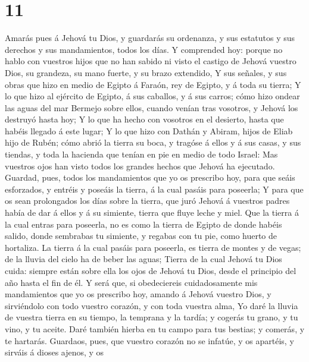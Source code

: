 \hypertarget{section-10}{%
\section{11}\label{section-10}}

 Amarás pues á Jehová tu Dios, y guardarás su ordenanza, y
sus estatutos y sus derechos y sus mandamientos, todos los días.
 Y comprended hoy: porque no hablo con vuestros hijos que no
han sabido ni visto el castigo de Jehová vuestro Dios, su grandeza, su
mano fuerte, y su brazo extendido,  Y sus señales, y sus
obras que hizo en medio de Egipto á Faraón, rey de Egipto, y á toda su
tierra;  Y lo que hizo al ejército de Egipto, á sus
caballos, y á sus carros; cómo hizo ondear las aguas del mar Bermejo
sobre ellos, cuando venían tras vosotros, y Jehová los destruyó hasta
hoy;  Y lo que ha hecho con vosotros en el desierto, hasta
que habéis llegado á este lugar;  Y lo que hizo con Dathán y
Abiram, hijos de Eliab hijo de Rubén; cómo abrió la tierra su boca, y
tragóse á ellos y á sus casas, y sus tiendas, y toda la hacienda que
tenían en pie en medio de todo Israel:  Mas vuestros ojos
han visto todos los grandes hechos que Jehová ha ejecutado. 
Guardad, pues, todos los mandamientos que yo os prescribo hoy, para que
seáis esforzados, y entréis y poseáis la tierra, á la cual pasáis para
poseerla;  Y para que os sean prolongados los días sobre la
tierra, que juró Jehová á vuestros padres había de dar á ellos y á su
simiente, tierra que fluye leche y miel.  Que la tierra á
la cual entras para poseerla, no es como la tierra de Egipto de donde
habéis salido, donde sembrabas tu simiente, y regabas con tu pie, como
huerto de hortaliza.  La tierra á la cual pasáis para
poseerla, es tierra de montes y de vegas; de la lluvia del cielo ha de
beber las aguas;  Tierra de la cual Jehová tu Dios cuida:
siempre están sobre ella los ojos de Jehová tu Dios, desde el principio
del año hasta el fin de él.  Y será que, si obedeciereis
cuidadosamente mis mandamientos que yo os prescribo hoy, amando á Jehová
vuestro Dios, y sirviéndolo con todo vuestro corazón, y con toda vuestra
alma,  Yo daré la lluvia de vuestra tierra en su tiempo, la
temprana y la tardía; y cogerás tu grano, y tu vino, y tu aceite.
 Daré también hierba en tu campo para tus bestias; y
comerás, y te hartarás.  Guardaos, pues, que vuestro
corazón no se infatúe, y os apartéis, y sirváis á dioses ajenos, y os
